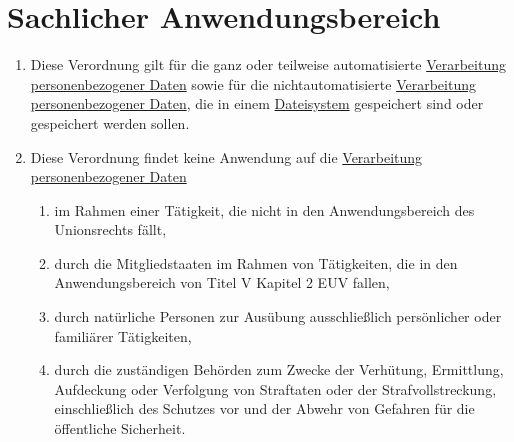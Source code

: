 \chapter{Sachlicher Anwendungsbereich}
\label{ch:2}

\begin{commentblock}
\begin{enumerate}

  \item Diese Verordnung gilt für die ganz oder teilweise automatisierte \hyperref[itm:04-2]{Verarbeitung} \hyperref
   [itm:04-1]{personenbezogener Daten} sowie für die nichtautomatisierte \hyperref[itm:04-2]{Verarbeitung} \hyperref
   [itm:04-1]{personenbezogener Daten}, die in einem \hyperref[itm:04-6]{Dateisystem} gespeichert sind oder gespeichert
   werden sollen.%
  \label{itm:02-1}

  \item Diese Verordnung findet keine Anwendung auf die \hyperref[itm:04-2]{Verarbeitung} \hyperref[itm:04-1]
   {personenbezogener Daten}%
  \label{itm:02-2}

  \begin{enumerate}
  
    \item im Rahmen einer Tätigkeit, die nicht in den Anwendungsbereich des Unionsrechts fällt,%
    \label{itm:02-2a}

    \item 
     durch die Mitgliedstaaten im Rahmen von Tätigkeiten, die in den Anwendungsbereich von Titel V Kapitel 2 EUV
     fallen,%
    \label{itm:02-2b}

    \item durch natürliche Personen zur Ausübung ausschließlich persönlicher oder familiärer Tätigkeiten,%
    \label{itm:02-2c}

    \item durch die zuständigen Behörden zum Zwecke der Verhütung, Ermittlung, Aufdeckung oder Verfolgung von Straftaten
     oder der Strafvollstreckung, einschließlich des Schutzes vor und der Abwehr von Gefahren für die öffentliche
     Sicherheit.%
    \label{itm:02-2d}

  \end{enumerate}


\end{enumerate}
\end{commentblock}
